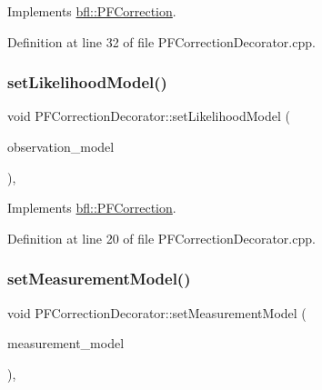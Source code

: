 Implements \mbox{\hyperlink{classbfl_1_1PFCorrection_a891c7d498caffb4d11e5ebdaa475c683}{bfl\+::\+P\+F\+Correction}}.



Definition at line 32 of file P\+F\+Correction\+Decorator.\+cpp.

\mbox{\label{classbfl_1_1PFCorrectionDecorator_ab1065f8e47e4e51bc846b2d693b4bb88}} 
\subsubsection{\texorpdfstring{set\+Likelihood\+Model()}{setLikelihoodModel()}}
{\footnotesize\ttfamily void P\+F\+Correction\+Decorator\+::set\+Likelihood\+Model (\begin{DoxyParamCaption}\item[{std\+::unique\+\_\+ptr$<$ \mbox{\hyperlink{classbfl_1_1LikelihoodModel}{Likelihood\+Model}} $>$}]{observation\+\_\+model }\end{DoxyParamCaption})\hspace{0.3cm}{\ttfamily [override]}, {\ttfamily [virtual]}}



Implements \mbox{\hyperlink{classbfl_1_1PFCorrection_aa84e757c694d4ad375cdd543d42ac34c}{bfl\+::\+P\+F\+Correction}}.



Definition at line 20 of file P\+F\+Correction\+Decorator.\+cpp.

\mbox{\label{classbfl_1_1PFCorrectionDecorator_a6e96dbb6591e44d9ebaa186c6e50569b}} 
\subsubsection{\texorpdfstring{set\+Measurement\+Model()}{setMeasurementModel()}}
{\footnotesize\ttfamily void P\+F\+Correction\+Decorator\+::set\+Measurement\+Model (\begin{DoxyParamCaption}\item[{std\+::unique\+\_\+ptr$<$ \mbox{\hyperlink{classbfl_1_1MeasurementModel}{Measurement\+Model}} $>$}]{measurement\+\_\+model }\end{DoxyParamCaption})\hspace{0.3cm}{\ttfamily [override]}, {\ttfamily [virtual]}}



